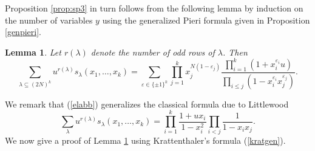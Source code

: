 \documentclass[11pt]{amsart}
\newtheorem{lemma}{Lemma}
\begin{document}
Proposition \ref{prop:sp3} in turn follows from the following
lemma by induction on the number of variables $y$ using the
generalized Pieri formula given in Proposition \ref{genpieri}.

\begin{lemma}
  \label{lem:sp3}Let $r ( \lambda )$ denote the number of odd rows of
  $\lambda$. Then
  \begin{equation}
    \label{elabb} \sum_{\lambda \subseteq ( 2 N )^k} u^{r ( \lambda )}
    s_{\lambda} ( x_1, \ldots, x_k ) = \sum_{\varepsilon \in \{ \pm 1 \}^k}
    \prod_{j = 1}^k x_j^{N ( 1 - \varepsilon_j )} \frac{\prod_{i = 1}^k ( 1 +
    x_i^{\varepsilon_i} u )}{\prod_{i \leqslant j} ( 1 - x_i^{\varepsilon_i}
    x_j^{\varepsilon_j} )}.
  \end{equation}
\end{lemma}

We remark that (\ref{elabb}) generalizes the classical formula due
to Littlewood {\cite{Li}}
\begin{equation}
  \sum_{\lambda} u^{r ( \lambda )} s_{\lambda} ( x_1, \ldots, x_k ) = \prod_{i
  = 1}^k \frac{1 + ux_i}{1 - x_i^2} \prod_{i < j} \frac{1}{1 - x_i x_j} .
\end{equation}
We now give a proof of Lemma \ref{lem:sp3} using Krattenthaler's
formula (\ref{kratgen}).
\end{document}
